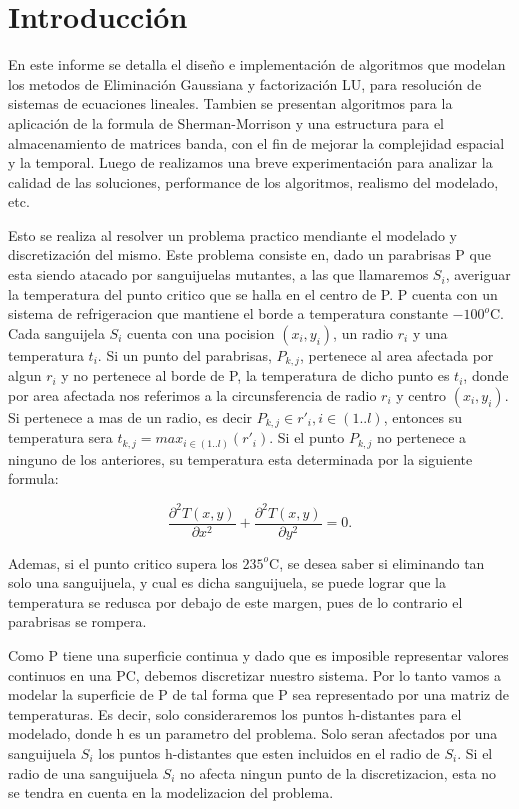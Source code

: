 \section{Introducción}

En este informe se detalla el dise\~no e implementaci\'on de algoritmos que modelan los metodos de Eliminaci\'on Gaussiana y factorizaci\'on LU,
para resoluci\'on de sistemas de ecuaciones lineales. Tambien se presentan algoritmos para la aplicaci\'on de la formula de Sherman-Morrison y
una estructura para el almacenamiento de matrices banda, con el fin de mejorar la complejidad espacial y la temporal. Luego de realizamos una %
breve experimentaci\'on para analizar la calidad de las soluciones, performance de los algoritmos, realismo del modelado, etc.

Esto se realiza al resolver un problema practico mendiante el modelado y discretizaci\'on del mismo. Este problema consiste en, dado un parabrisas 
P que esta siendo atacado por sanguijuelas mutantes, a las que llamaremos $S_i$, averiguar la temperatura del punto critico que se
halla en el centro de P. P cuenta con un sistema de refrigeracion que mantiene el borde a temperatura constante
$-100^o$C. Cada sanguijela $S_i$ cuenta con una pocision $(x_i, y_i)$, un radio $r_i$ y una temperatura $t_i$. Si un punto del
parabrisas, $P_{k,j}$, 
pertenece al area afectada por algun $r_i$ y no pertenece al borde de P, la temperatura de dicho punto es $t_i$, donde por area afectada nos referimos a la circunsferencia de 
radio $r_i $ y centro $(x_i, y_i)$. Si pertenece a mas de un radio, es decir
$P_{k,j} \in {r'_i}, i\in (1..l) $, entonces su temperatura sera 
$t_{k,j}=max_{i\in (1..l)}(r'_i) $. Si el punto $P_{k,j}$ no pertenece a ninguno de los anteriores,
su temperatura esta determinada por la siguiente formula:


\begin{equation}\label{eq:calor}
\frac{\partial^2T(x,y)}{\partial x^{2}}+\frac{\partial^2 T(x,y)}{\partial y^{2}} = 0.
\end{equation}

Ademas, si el punto critico supera los $235^o $C, se desea saber si eliminando tan solo una sanguijuela, y cual es dicha sanguijuela,
se puede lograr que la 
temperatura se redusca por debajo de este margen, pues de lo contrario el parabrisas se rompera.

Como P tiene una superficie continua y dado que es imposible representar valores continuos en una PC,
debemos discretizar nuestro sistema. Por lo tanto vamos a modelar la superficie de P de tal forma que P sea representado por una matriz de
temperaturas. Es decir, solo consideraremos los puntos h-distantes para el modelado, donde h es un parametro del problema. 
Solo seran afectados por una sanguijuela $S_i$ los puntos h-distantes que esten incluidos en el radio de $S_i$. Si el radio de una sanguijuela $S_i$ no 
afecta ningun punto de la discretizacion, esta no se tendra en cuenta en la modelizacion del problema. 

